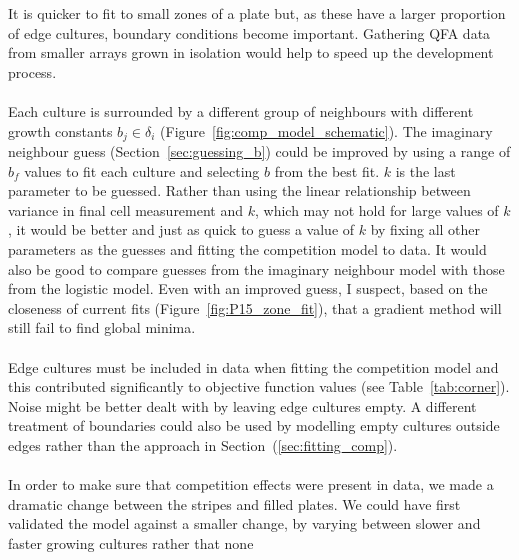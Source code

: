 It is quicker to fit to small zones of a plate but, as these have a
larger proportion of edge cultures, boundary conditions become
important. Gathering QFA data from smaller arrays grown in isolation
would help to speed up the development process.
\\\\
Each culture is surrounded by a different group of neighbours with
different growth constants \(b_{j} \in \delta_{i}\)
(Figure~\ref{fig:comp_model_schematic}). The imaginary neighbour guess
(Section~\ref{sec:guessing_b}) could be improved by using a range of
\(b_{f}\) values to fit each culture and selecting \(b\) from the best
fit. \(k\) is the last parameter to be guessed. Rather than using the
linear relationship between variance in final cell measurement and
\(k\), which may not hold for large values of \(k\), it would be
better and just as quick to guess a value of \(k\) by fixing all other
parameters as the guesses and fitting the competition model to
data. It would also be good to compare guesses from the imaginary
neighbour model with those from the logistic model. Even with an
improved guess, I suspect, based on the closeness of current fits
(Figure~\ref{fig:P15_zone_fit}), that a gradient method will still
fail to find global minima.
\\\\
Edge cultures must be included in data when fitting the competition
model and this contributed significantly to objective function values
(see Table~\ref{tab:corner}). Noise might be better dealt with by
leaving edge cultures empty. A different treatment of boundaries could
also be used by modelling empty cultures outside edges rather than the
approach in Section~(\ref{sec:fitting_comp}).
\\\\
In order to make sure that competition effects were present in data,
we made a dramatic change between the stripes and filled plates. We
could have first validated the model against a smaller change, by
varying between slower and faster growing cultures rather that none
